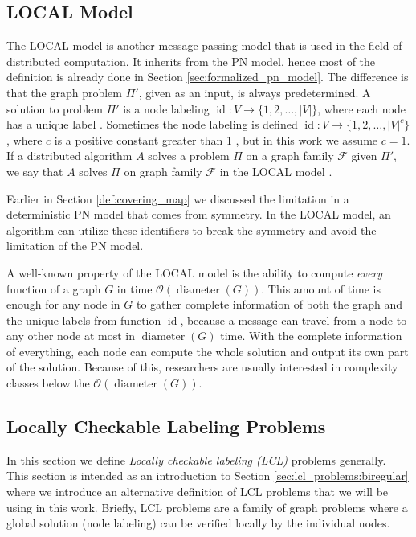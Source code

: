 \subsection{LOCAL Model} \label{sec:local_model}
The LOCAL model is another message passing model that is used in the field of distributed computation.
It inherits from the PN model, hence most of the definition is already done in Section \ref{sec:formalized_pn_model}.
The difference is that the graph problem $\Pi'$, given as an input, is always predetermined.
A solution to problem $\Pi'$ is a node labeling $\operatorname{id}\colon V \rightarrow \{1,2,\dotsc,|V|\}$, where each node has a unique label \cite{DBLP:conf/focs/Linial87}.
Sometimes the node labeling is defined $\operatorname{id}\colon V \rightarrow \{1,2,\dotsc,|V|^c\}$, where $c$ is a positive constant greater than 1 \cite{HirvonenSuomelaDistAlg2020}, but in this work we assume $c=1$.
If a distributed algorithm $A$ solves a problem $\Pi$ on a graph family $\mathcal{F}$ given $\Pi'$, we say that $A$ solves $\Pi$ on graph family $\mathcal{F}$ in the LOCAL model \cite{HirvonenSuomelaDistAlg2020}.

Earlier in Section \ref{def:covering_map} we discussed the limitation in a deterministic PN model that comes from symmetry.
In the LOCAL model, an algorithm can utilize these identifiers to break the symmetry and avoid the limitation of the PN model.

A well-known property of the LOCAL model is the ability to compute \emph{every} function of a graph $G$ in time $\mathcal{O}(\operatorname{diameter}(G))$.
This amount of time is enough for any node in $G$ to gather complete information of both the graph and the unique labels from function $\operatorname{id}$, because a message can travel from a node to any other node at most in $\operatorname{diameter}(G)$ time.
With the complete information of everything, each node can compute the whole solution and output its own part of the solution.
Because of this, researchers are usually interested in complexity classes below the $\mathcal{O}(\operatorname{diameter}(G))$.

\subsection{Locally Checkable Labeling Problems} \label{sec:lcl_problems}
In this section we define \emph{Locally checkable labeling (LCL)} problems generally.
This section is intended as an introduction to Section \ref{sec:lcl_problems:biregular} where we introduce an alternative definition of LCL problems that we will be using in this work.
Briefly, LCL problems are a family of graph problems where a global solution (node labeling) can be verified locally by the individual nodes.


